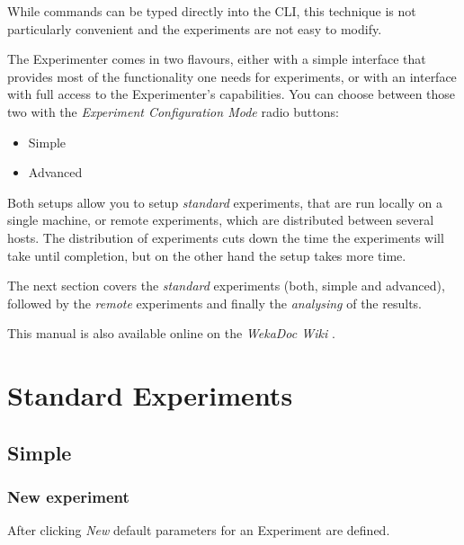 \documentclass[a4paper]{article}
\begin{document}
While commands can be typed directly into the CLI, this technique is not particularly convenient and the experiments are not easy to modify.

The Experimenter comes in two flavours, either with a simple interface that provides most of the functionality one needs for experiments, or with an interface with full access to the Experimenter's capabilities. You can choose between those two with the \textit{Experiment Configuration Mode} radio buttons:

\begin{itemize}
	\item Simple
	\item Advanced 
\end{itemize}

Both setups allow you to setup \textit{standard} experiments, that are run locally on a single machine, or remote experiments, which are distributed between several hosts. The distribution of experiments cuts down the time the experiments will take until completion, but on the other hand the setup takes more time.

The next section covers the \textit{standard} experiments (both, simple and advanced), followed by the \textit{remote} experiments and finally the \textit{analysing} of the results.

This manual is also available online on the \textit{WekaDoc Wiki} \cite{wekadoc}.


\newpage
\section{Standard Experiments}


\subsection{Simple}

\subsubsection{New experiment}

After clicking \textit{New} default parameters for an Experiment are defined.

\begin{center}
\end{center}
\end{document}
